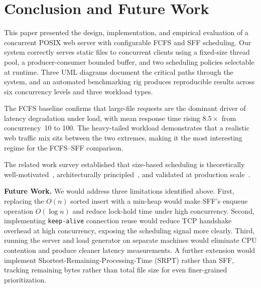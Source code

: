 \documentclass[conference]{IEEEtran}
\begin{document}
\section{Conclusion and Future Work}
\label{sec:conclusion}

This paper presented the design, implementation, and empirical evaluation of
a concurrent POSIX web server with configurable FCFS and SFF scheduling. Our
system correctly serves static files to concurrent clients using a fixed-size
thread pool, a producer-consumer bounded buffer, and two scheduling policies
selectable at runtime. Three UML diagrams document the critical paths through
the system, and an automated benchmarking rig produces reproducible results
across six concurrency levels and three workload types.

The FCFS baseline confirms that large-file requests are the dominant driver
of latency degradation under load, with mean response time rising $8.5\times$
from concurrency~10 to 100. The heavy-tailed workload demonstrates that a
realistic web traffic mix sits between the two extremes, making it the most
interesting regime for the FCFS--SFF comparison.

The related work survey established that size-based scheduling is theoretically
well-motivated~\cite{harchol2003,schroeder2006}, architecturally
principled~\cite{welsh2001,lampson1983}, and validated at production
scale~\cite{ghost2021,persephone2021,ousterhout2019}.

\textbf{Future Work.} We would address three limitations identified above.
First, replacing the $O(n)$ sorted insert with a min-heap would make
SFF's enqueue operation $O(\log n)$ and reduce lock-hold time under high
concurrency. Second, implementing \texttt{keep-alive}
connection reuse would reduce TCP handshake overhead at high concurrency,
exposing the scheduling signal more clearly. Third, running the server and
load generator on separate machines would eliminate CPU contention and produce
cleaner latency measurements. A further extension would implement
Shortest-Remaining-Processing-Time (SRPT) rather than SFF, tracking remaining
bytes rather than total file size for even finer-grained prioritization.
\end{document}

